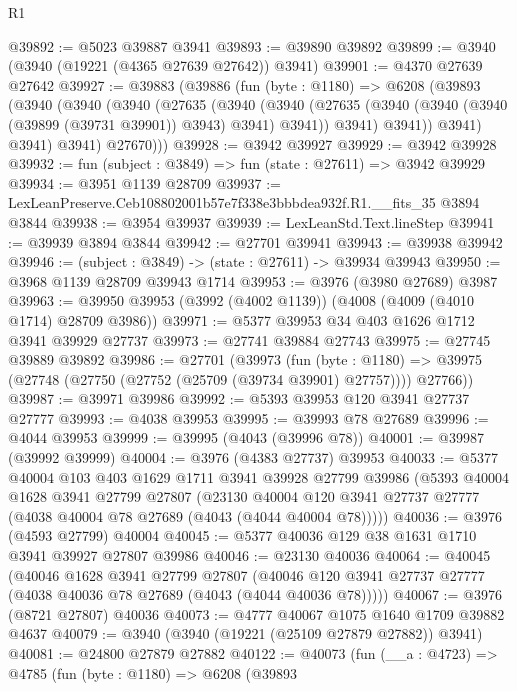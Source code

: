 \begin{lexlean}{R1}
\begin{coremodule}
@39892 := @5023 @39887 @3941
@39893 := @39890 @39892
@39899 := @3940 (@3940 (@19221 (@4365 @27639 @27642)) @3941)
@39901 := @4370 @27639 @27642
@39927 := @39883
    (@39886
      (fun (byte : @1180) =>
      @6208
        (@39893
          (@3940
            (@3940
              (@3940
                (@27635
                  (@3940
                    (@3940
                      (@27635 (@3940 (@3940 (@3940 (@39899 (@39731 @39901)) @3943) @3941) @3941))
                      @3941)
                    @3941))
                @3941)
              @3941)
            @3941)
          @27670)))
@39928 := @3942 @39927
@39929 := @3942 @39928
@39932 := fun (subject : @3849) => fun (state : @27611) => @3942 @39929
@39934 := @3951 @1139 @28709
@39937 := LexLeanPreserve.Ceb108802001b57e7f338e3bbbdea932f.R1.__fits_35 @3894 @3844
@39938 := @3954 @39937
@39939 := LexLeanStd.Text.lineStep
@39941 := @39939 @3894 @3844
@39942 := @27701 @39941
@39943 := @39938 @39942
@39946 := (subject : @3849) -> (state : @27611) -> @39934 @39943
@39950 := @3968 @1139 @28709 @39943 @1714
@39953 := @3976 (@3980 @27689) @3987
@39963 := @39950 @39953 (@3992 (@4002 @1139)) (@4008 (@4009 (@4010 @1714) @28709 @3986))
@39971 := @5377 @39953 @34 @403 @1626 @1712 @3941 @39929 @27737
@39973 := @27741 @39884 @27743
@39975 := @27745 @39889 @39892
@39986 := @27701
    (@39973
      (fun (byte : @1180) =>
      @39975 (@27748 (@27750 (@27752 (@25709 (@39734 @39901) @27757)))) @27766))
@39987 := @39971 @39986
@39992 := @5393 @39953 @120 @3941 @27737 @27777
@39993 := @4038 @39953
@39995 := @39993 @78 @27689
@39996 := @4044 @39953
@39999 := @39995 (@4043 (@39996 @78))
@40001 := @39987 (@39992 @39999)
@40004 := @3976 (@4383 @27737) @39953
@40033 := @5377
    @40004
    @103
    @403
    @1629
    @1711
    @3941
    @39928
    @27799
    @39986
    (@5393
      @40004
      @1628
      @3941
      @27799
      @27807
      (@23130 @40004 @120 @3941 @27737 @27777 (@4038 @40004 @78 @27689 (@4043 (@4044 @40004 @78)))))
@40036 := @3976 (@4593 @27799) @40004
@40045 := @5377 @40036 @129 @38 @1631 @1710 @3941 @39927 @27807 @39986
@40046 := @23130 @40036
@40064 := @40045
    (@40046
      @1628
      @3941
      @27799
      @27807
      (@40046 @120 @3941 @27737 @27777 (@4038 @40036 @78 @27689 (@4043 (@4044 @40036 @78)))))
@40067 := @3976 (@8721 @27807) @40036
@40073 := @4777 @40067 @1075 @1640 @1709 @39882 @4637
@40079 := @3940 (@3940 (@19221 (@25109 @27879 @27882)) @3941)
@40081 := @24800 @27879 @27882
@40122 := @40073
    (fun (__a : @4723) =>
    @4785
      (fun (byte : @1180) =>
      @6208
        (@39893

\end{coremodule}
\end{lexlean}
